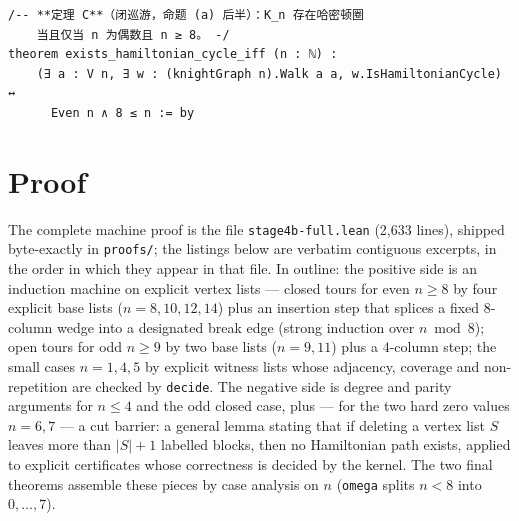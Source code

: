 \documentclass[11pt]{article}
\begin{document}
\begin{lstlisting}[caption={Frozen statement, verbatim lines 79--83: the head
of Theorem~\ref{thm:closed}.},label={lst:stmt-closed}]
/-- **定理 C**（闭巡游，命题 (a) 后半）：K_n 存在哈密顿圈
    当且仅当 n 为偶数且 n ≥ 8。 -/
theorem exists_hamiltonian_cycle_iff (n : ℕ) :
    (∃ a : V n, ∃ w : (knightGraph n).Walk a a, w.IsHamiltonianCycle) ↔
      Even n ∧ 8 ≤ n := by
\end{lstlisting}

\section{Proof}

The complete machine proof is the file \texttt{stage4b-full.lean} (2{,}633
lines), shipped byte-exactly in \texttt{proofs/}; the listings below are
verbatim contiguous excerpts, in the order in which they appear in that
file. In outline: the positive side is an induction machine on explicit
vertex lists --- closed tours for even $n\ge 8$ by four explicit base lists
($n=8,10,12,14$) plus an insertion step that splices a fixed 8-column wedge
into a designated break edge (strong induction over $n \bmod 8$); open tours
for odd $n\ge 9$ by two base lists ($n=9,11$) plus a $4$-column step; the
small cases $n=1,4,5$ by explicit witness lists whose adjacency, coverage
and non-repetition are checked by \texttt{decide}. The negative side is
degree and parity arguments for $n\le 4$ and the odd closed case, plus ---
for the two hard zero values $n=6,7$ --- a cut barrier: a general lemma
stating that if deleting a vertex list $S$ leaves more than $|S|+1$ labelled
blocks, then no Hamiltonian path exists, applied to explicit certificates
whose correctness is decided by the kernel. The two final theorems assemble
these pieces by case analysis on $n$ (\texttt{omega} splits $n<8$ into
$0,\dots,7$).
\end{document}
